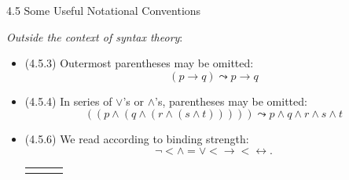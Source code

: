 \begin{frame}{4.5 Some Useful Notational Conventions}

\emph{Outside the context of syntax theory}:

	\begin{itemize}
	
		\item (4.5.3) Outermost parentheses may be omitted: \[(p\to q)\leadsto p\to q\]
		
		\item (4.5.4) In series of $\lor$'s or $\land$'s, parentheses may be omitted:\[((p\land (q\land (r\land (s\land t)))))\leadsto p\land q\land r\land s\land t\]
	
		\item (4.5.6) We read according to binding strength: \[{\neg} <{\land}={\lor}<{\to}<{\leftrightarrow}.\]
		
			\begin{center}
		
		\begin{tabular}{c c c}
		\begin{tikzpicture}
		{\Tree [.$p\land q\to r$ [.$p$ ] [.$q\to r$ [.$q$ ] [.$r$ ] ] ]}
		\end{tikzpicture}

		& 
		
		\qquad \raisebox{7.5ex}{vs.} \qquad 
				\begin{tikzpicture}

		{\Tree [.$p\land q\to r$ [.$p\land q$ [.$p$ ] [.$q$ ] ] [.$r$ ] ]}
		\end{tikzpicture}

		\end{tabular}
		\end{center}
	
	\end{itemize}


\end{frame}

